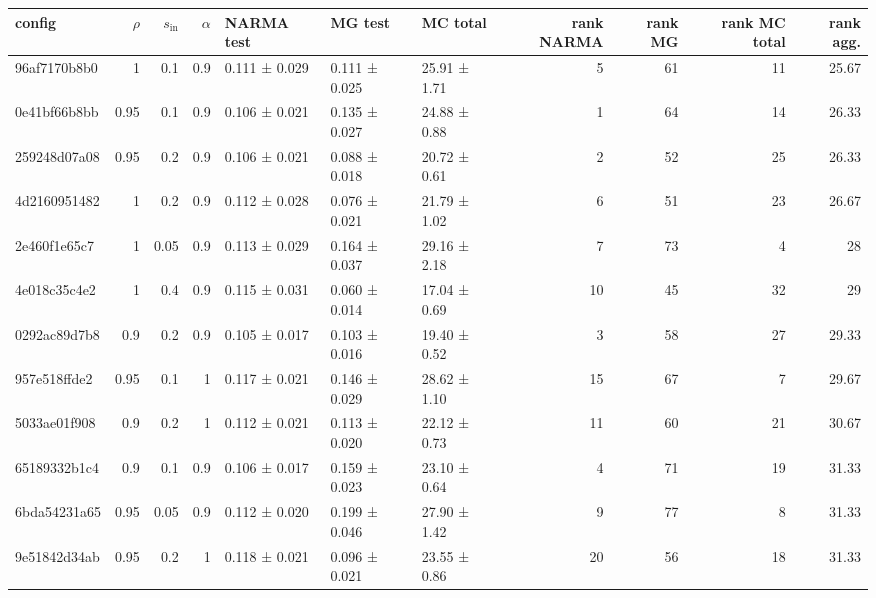 \begin{tabular}{lrrrlllrrrr}
\toprule
config & $\rho$ & $s_{\mathrm{in}}$ & $\alpha$ & NARMA test & MG test & MC total & rank NARMA & rank MG & rank MC total & rank agg. \\
\midrule
96af7170b8b0 & 1 & 0.1 & 0.9 & 0.111 ± 0.029 & 0.111 ± 0.025 & 25.91 ± 1.71 & 5 & 61 & 11 & 25.67 \\
0e41bf66b8bb & 0.95 & 0.1 & 0.9 & 0.106 ± 0.021 & 0.135 ± 0.027 & 24.88 ± 0.88 & 1 & 64 & 14 & 26.33 \\
259248d07a08 & 0.95 & 0.2 & 0.9 & 0.106 ± 0.021 & 0.088 ± 0.018 & 20.72 ± 0.61 & 2 & 52 & 25 & 26.33 \\
4d2160951482 & 1 & 0.2 & 0.9 & 0.112 ± 0.028 & 0.076 ± 0.021 & 21.79 ± 1.02 & 6 & 51 & 23 & 26.67 \\
2e460f1e65c7 & 1 & 0.05 & 0.9 & 0.113 ± 0.029 & 0.164 ± 0.037 & 29.16 ± 2.18 & 7 & 73 & 4 & 28 \\
4e018c35c4e2 & 1 & 0.4 & 0.9 & 0.115 ± 0.031 & 0.060 ± 0.014 & 17.04 ± 0.69 & 10 & 45 & 32 & 29 \\
0292ac89d7b8 & 0.9 & 0.2 & 0.9 & 0.105 ± 0.017 & 0.103 ± 0.016 & 19.40 ± 0.52 & 3 & 58 & 27 & 29.33 \\
957e518ffde2 & 0.95 & 0.1 & 1 & 0.117 ± 0.021 & 0.146 ± 0.029 & 28.62 ± 1.10 & 15 & 67 & 7 & 29.67 \\
5033ae01f908 & 0.9 & 0.2 & 1 & 0.112 ± 0.021 & 0.113 ± 0.020 & 22.12 ± 0.73 & 11 & 60 & 21 & 30.67 \\
65189332b1c4 & 0.9 & 0.1 & 0.9 & 0.106 ± 0.017 & 0.159 ± 0.023 & 23.10 ± 0.64 & 4 & 71 & 19 & 31.33 \\
6bda54231a65 & 0.95 & 0.05 & 0.9 & 0.112 ± 0.020 & 0.199 ± 0.046 & 27.90 ± 1.42 & 9 & 77 & 8 & 31.33 \\
9e51842d34ab & 0.95 & 0.2 & 1 & 0.118 ± 0.021 & 0.096 ± 0.021 & 23.55 ± 0.86 & 20 & 56 & 18 & 31.33 \\
\bottomrule
\end{tabular}
